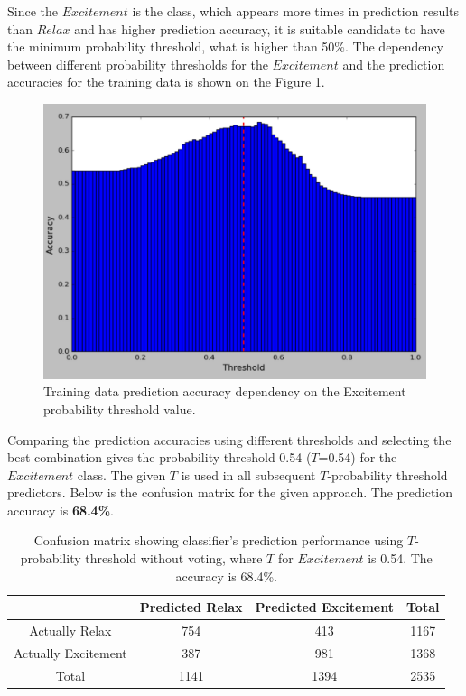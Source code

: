 \documentclass[12pt]{article}
\theoremstyle{definition}
\begin{document}
Since the $Excitement$ is the class, which appears more times in prediction results than $Relax$ and has higher prediction accuracy, it is suitable candidate to have the minimum probability threshold, what is higher than 50\%. The dependency between different probability thresholds for the $Excitement$ and the prediction accuracies for the training data is shown on the Figure \ref{fig:probability_thresholds}.
\begin{figure} [H]
\begin{center}
\includegraphics[width=1\textwidth]{probability_thresholds}
\caption{Training data prediction accuracy dependency on the Excitement probability threshold value.}
\label{fig:probability_thresholds}
\end{center}
\end{figure}

Comparing the prediction accuracies using different thresholds and selecting the best combination gives the probability threshold 0.54 ($T$=0.54) for the $Excitement$ class. The given $T$ is used in all subsequent $T$-probability threshold predictors. Below is the confusion matrix for the given approach. The prediction accuracy is \textbf{68.4\%}.

\begin{table}[H]
\begin{center}
  \begin{tabular}{ | c | c | c | c | }
    \hline
     & Predicted Relax & Predicted Excitement & Total \\ \hline
    Actually Relax & 754 & 413 & 1167 \\ \hline
    Actually Excitement & 387 & 981 & 1368 \\ \hline
    Total & 1141 & 1394 & 2535 \\ 
    \hline
  \end{tabular}
\end{center}
\caption{Confusion matrix showing classifier's prediction performance using $T$-probability threshold without voting, where $T$ for $Excitement$ is 0.54. The accuracy is 68.4\%.}
\end{table}
\end{document}
